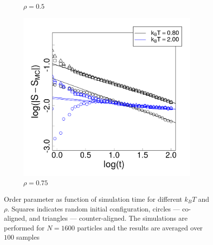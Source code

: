 \begin{figure}[h]
\begin{subfigure}[t]{0.32\textwidth}
	\captionsetup{justification=centering, width=0.9\columnwidth}
	\caption{$\rho = 0.5$}
\end{subfigure}
\begin{subfigure}[t]{0.32\textwidth}
	\centering
	\includegraphics[width=\textwidth]{Images/relax_75.png}
	\captionsetup{justification=centering, width=0.9\columnwidth}
	\caption{$\rho = 0.75$}
\end{subfigure}
\captionsetup{justification=centering, width=0.9\columnwidth}
\caption{Order parameter as function of simulation time for different $k_BT$ and $\rho$. Squares indicates random initial configuration, circles --- co-aligned, and triangles --- counter-aligned. The simulations are performed for $N = 1600$ particles and the results are averaged over $100$ samples}
\label{fig:short_time_order_parameter_different_density}
\end{figure}
